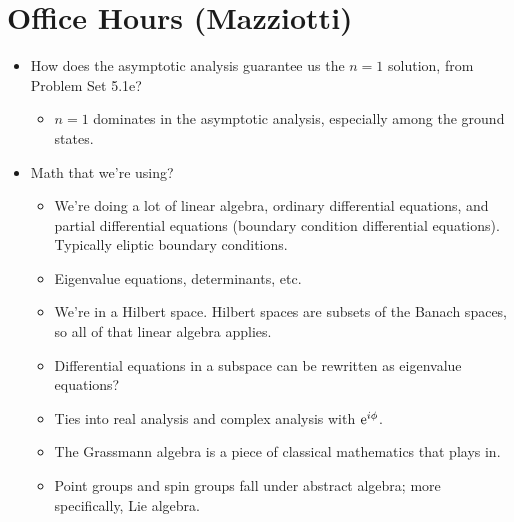 \documentclass[../notes.tex]{subfiles}
\begin{document}
\section{Office Hours (Mazziotti)}
\begin{itemize}
    \item How does the asymptotic analysis guarantee us the $n=1$ solution, from Problem Set 5.1e?
    \begin{itemize}
        \item $n=1$ dominates in the asymptotic analysis, especially among the ground states.
    \end{itemize}
    \item Math that we're using?
    \begin{itemize}
        \item We're doing a lot of linear algebra, ordinary differential equations, and partial differential equations (boundary condition differential equations). Typically eliptic boundary conditions.
        \item Eigenvalue equations, determinants, etc.
        \item We're in a Hilbert space. Hilbert spaces are subsets of the Banach spaces, so all of that linear algebra applies.
        \item Differential equations in a subspace can be rewritten as eigenvalue equations?
        \item Ties into real analysis and complex analysis with $\e[i\phi]$.
        \item The Grassmann algebra is a piece of classical mathematics that plays in.
        \item Point groups and spin groups fall under abstract algebra; more specifically, Lie algebra.
    \end{itemize}
\end{itemize}
\end{document}
